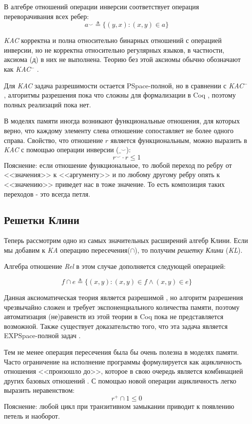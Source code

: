 \documentclass[times
              ,specification
              ,annotation
              ]{itmo-student-thesis}
\begin{document}
      В алгебре отношений операции инверсии соответствует операция переворачивания всех ребер:
      $$ a^\smile \triangleq \{ (y, x): (x, y) \in a \} $$

      \textit{KAC} корректна и полна относительно бинарных отношений с операцией инверсии, но не
      корректна относительно регулярных языков, в частности, аксиома (д) в них не выполнена. Теорию без
      этой аксиомы обычно обозначают как \textit{KAC}$^-$ \cite{AlgebrasOfRelation}.

      Для \textit{KAC} задача разрешимости остается PSpace-полной, но в сравнении с \textit{KAC}$^-$,
      алгоритмы разрешения пока что сложны для формализации в Coq \cite{AlgebrasOfRelation}, поэтому
      полных реализаций пока нет.

      В моделях памяти иногда возникают функциональные отношения, для которых верно, что каждому
      элементу слева отношение сопоставляет не более одного справа.
      Свойство, что отношение $ r $ является функциональным, можно выразить в
      \textit{KAC} с помощью операции инверсии ($ \_^{\smile} $):
      $$ r^{\smile} \cdot r \leq 1 $$
      Пояснение: если отношение функциональное, то любой переход по ребру от <<значения>> к
      <<аргументу>> и по любому другому ребру опять к <<значению>> приведет нас в тоже значение. То
      есть композиция таких переходов - это всегда петля.

    \subsection{Решетки Клини}
      Теперь рассмотрим одно из самых значительных расширений алгебр Клини.
      Если мы добавим к \textit{KA} операцию пересечения($\cap$),
      то получим \textit{решетку Клини} (\textit{KL}).

      Алгебра отношение \textit{Rel} в этом случае дополняется следующей операцией:

      $$ f \cap e \triangleq \{ (x, y) \colon (x, y) \in f \wedge (x, y) \in e \} $$

      Данная аксиоматическая теория является разрешимой \cite{petri_for_kal}, но алгоритм разрешения чрезвычайно
      сложен и требует экспоненциального количества памяти, поэтому автоматизация (не)равенств из этой
      теории в Coq пока не представляется возможной. Также существует доказательство того, что
      эта задача является EXPSpace-полной задач \cite{complexity_of_regular_intersection}.
      
      Тем не менее операция пересечения была бы очень полезна в моделях памяти.
      Часто ограничение на исполнение программы формулируется как ацикличность отношения <<произошло
      до>>, которое в свою очередь является комбинацией других базовых отношений \cite{rc11}. С помощью
      новой операции ацикличность легко выразить неравенством:
      $$ r^+ \cap 1 \leq 0 $$
      Пояснение: любой цикл при транзитивном замыкании приводит к появлению петель и наоборот.
\end{document}
